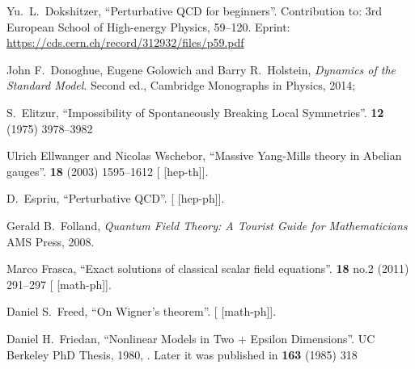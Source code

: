 \begin{thebibliography}{99}
Yu.~L.~Dokshitzer,
``Perturbative QCD for beginners''.
Contribution to: 3rd European School of High-energy Physics, 59--120.
Eprint: \url{https://cds.cern.ch/record/312932/files/p59.pdf}

John F.~Donoghue, Eugene Golowich and Barry R.~Holstein,
\textit{Dynamics of the Standard Model}.
Second ed., Cambridge Monographs in Physics, 2014;
{\tt{}}

S.~Elitzur,
``Impossibility of Spontaneously Breaking Local Symmetries''.
 \textbf{12} (1975) 3978--3982
{\tt{}}

Ulrich Ellwanger and Nicolas Wschebor,
``Massive Yang-Mills theory in Abelian gauges''.
 \textbf{18} (2003) 1595--1612
{\tt{}}
[ [hep-th]].

D.~Espriu,
``Perturbative QCD''.
[ [hep-ph]].

Gerald B.~Folland,
\textit{Quantum Field Theory: A Tourist Guide for Mathematicians}
AMS Press, 2008.

Marco Frasca,
``Exact solutions of classical scalar field equations''.
 \textbf{18} no.2 (2011) 291--297
{\tt{}}
[ [math-ph]].

Daniel S.~Freed,
``On Wigner's theorem''.
[ [math-ph]].

Daniel H.~Friedan,
``Nonlinear Models in Two + Epsilon Dimensions''.
UC Berkeley PhD Thesis, 1980,
{\tt{}}.
Later it was published in
 \textbf{163} (1985) 318
{\tt{}}




\end{thebibliography}
